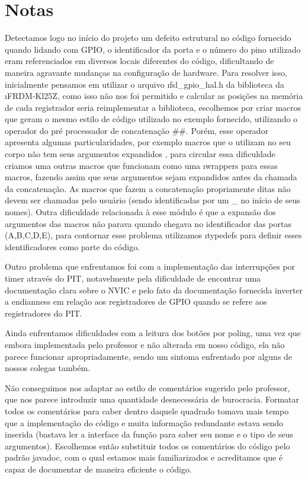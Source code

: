 \documentclass{article}
\begin{document}
\section{Notas}
Detectamos logo no início do projeto um defeito estrutural no código fornecido quando lidando com GPIO, o identificador da porta e o número do pino utilizado eram referenciados em diversos locais diferentes do código, dificultando de maneira agravante mudanças na configuração de hardware. Para resolver isso, inicialmente pensamos em utilizar o arquivo \i{fsl\_gpio\_hal.h} da biblioteca da \i{FRDM-Kl25Z}, como isso não nos foi permitido e calcular as posições na memória de cada registrador seria reimplementar a biblioteca, escolhemos por criar macros que geram o mesmo estilo de código utilizado no exemplo fornecido, utilizando o operador do pré processador de concatenação \#\#. Porém, esse operador apresenta algumas particularidades, por exemplo macros que o utilizam no seu corpo não tem seus argumentos expandidos \cite{bb:preprocessor}, para circular essa dificuldade criamos uma outras macros que funcionam como uma \i{wrappers} para essas macros, fazendo assim que seus argumentos sejam expandidos antes da chamada da concatenação. As macros que fazem a concatenação propriamente ditas não devem ser chamadas pelo usuário (sendo identificadas por um \_ no início de seus nomes).
Outra dificuldade relacionada à esse módulo é que a expansão dos argumentos das macros não parava quando chegava no identificador das portas (A,B,C,D,E), para contornar esse problema utilizamos \i{typedefs} para definir esses identificadores como parte do código.

Outro problema que enfrentamos foi com a implementação das interrupções por timer através do PIT, notavelmente pela dificuldade de encontrar uma documentação clara sobre o NVIC e pelo fato da documentação fornecida inverter a endianness em relação aos registradores de GPIO quando se refere aos registradores do PIT.

Ainda enfrentamos dificuldades com a leitura dos botões por poling, uma vez que embora implementada pelo professor e não alterada em nosso código, ela não parece funcionar apropriadamente, sendo um sintoma enfrentado por alguns de nossos colegas também.

Não conseguimos nos adaptar ao estilo de comentários sugerido pelo professor, que nos parece introduzir uma quantidade desnecessária de burocracia. Formatar todos os comentários para caber dentro daquele quadrado tomava mais tempo que a implementação do código e muita informação redundante estava sendo inserida (bastava ler a interface da função para saber seu nome e o tipo de seus argumentos). Escolhemos então substituir todos os comentários do código pelo padrão javadoc, com o qual estamos mais familiarizados e acreditamos que é capaz de documentar de maneira eficiente o código.
\end{document}
